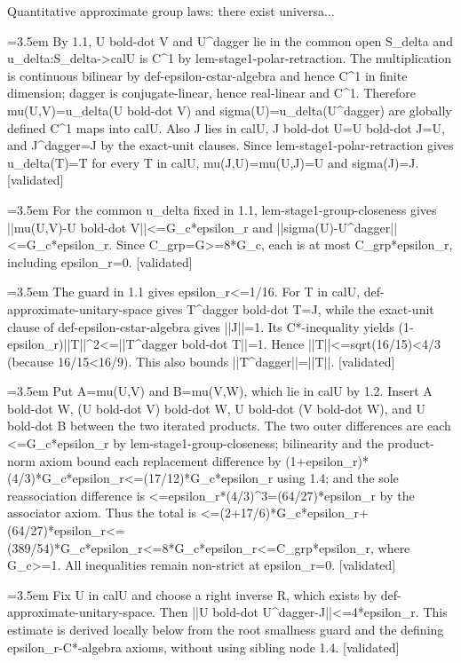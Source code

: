 \documentclass{article}
\newcommand{\step}[1]{\par\noindent\hangindent=3.5em\hangafter=1%
  \makebox[3.5em][l]{\textbf{#1.}}}
\newcommand{\steptag}[1]{\hfill{\small\textsf{[#1]}}}
\begin{document}
\begin{proofbox}{Quantitative approximate group laws: there exist universa...}
\step{1.2} By 1.1, U bold-dot V and U\textasciicircum{}dagger lie in the common open S\_delta and u\_delta:S\_delta->calU is C\textasciicircum{}1 by lem-stage1-polar-retraction. The multiplication is continuous bilinear by def-epsilon-cstar-algebra and hence C\textasciicircum{}1 in finite dimension; dagger is conjugate-linear, hence real-linear and C\textasciicircum{}1. Therefore mu(U,V)=u\_delta(U bold-dot V) and sigma(U)=u\_delta(U\textasciicircum{}dagger) are globally defined C\textasciicircum{}1 maps into calU. Also J lies in calU, J bold-dot U=U bold-dot J=U, and J\textasciicircum{}dagger=J by the exact-unit clauses. Since lem-stage1-polar-retraction gives u\_delta(T)=T for every T in calU, mu(J,U)=mu(U,J)=U and sigma(J)=J. \steptag{validated} \\[4pt]
\step{1.3} For the common u\_delta fixed in 1.1, lem-stage1-group-closeness gives ||mu(U,V)-U bold-dot V||<=G\_c*epsilon\_r and ||sigma(U)-U\textasciicircum{}dagger||<=G\_c*epsilon\_r. Since C\_grp=G>=8*G\_c, each is at most C\_grp*epsilon\_r, including epsilon\_r=0. \steptag{validated} \\[4pt]
\step{1.4} The guard in 1.1 gives epsilon\_r<=1/16. For T in calU, def-approximate-unitary-space gives T\textasciicircum{}dagger bold-dot T=J, while the exact-unit clause of def-epsilon-cstar-algebra gives ||J||=1. Its C*-inequality yields (1-epsilon\_r)||T||\textasciicircum{}2<=||T\textasciicircum{}dagger bold-dot T||=1. Hence ||T||<=sqrt(16/15)<4/3 (because 16/15<16/9). This also bounds ||T\textasciicircum{}dagger||=||T||. \steptag{validated} \\[4pt]
\step{1.5} Put A=mu(U,V) and B=mu(V,W), which lie in calU by 1.2. Insert A bold-dot W, (U bold-dot V) bold-dot W, U bold-dot (V bold-dot W), and U bold-dot B between the two iterated products. The two outer differences are each <=G\_c*epsilon\_r by lem-stage1-group-closeness; bilinearity and the product-norm axiom bound each replacement difference by (1+epsilon\_r)*(4/3)*G\_c*epsilon\_r<=(17/12)*G\_c*epsilon\_r using 1.4; and the sole reassociation difference is <=epsilon\_r*(4/3)\textasciicircum{}3=(64/27)*epsilon\_r by the associator axiom. Thus the total is <=(2+17/6)*G\_c*epsilon\_r+(64/27)*epsilon\_r<=(389/54)*G\_c*epsilon\_r<=8*G\_c*epsilon\_r<=C\_grp*epsilon\_r, where G\_c>=1. All inequalities remain non-strict at epsilon\_r=0. \steptag{validated} \\[4pt]
\step{1.6} Fix U in calU and choose a right inverse R, which exists by def-approximate-unitary-space. Then ||U bold-dot U\textasciicircum{}dagger-J||<=4*epsilon\_r. This estimate is derived locally below from the root smallness guard and the defining epsilon\_r-C*-algebra axioms, without using sibling node 1.4. \steptag{validated} \\[6pt]

\end{proofbox}
\end{document}
